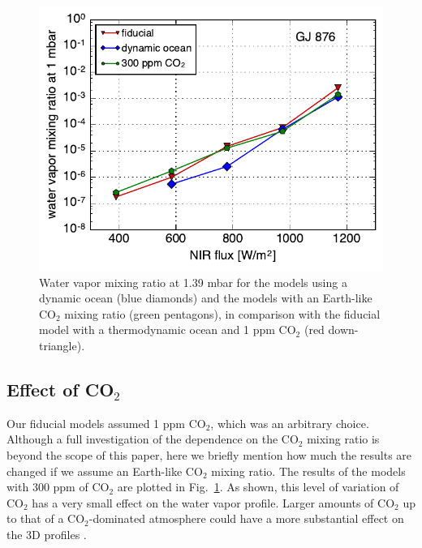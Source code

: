 \documentclass[11pt,numberedappendix,twocolappendix,]{emulateapj}
\def\wv{water vapor}
\begin{document}
\begin{figure}[!h]
    \begin{center}
    \includegraphics[width=0.9\hsize]{xH2O_sensitivity.pdf}
    \end{center}
\caption{Water vapor mixing ratio at 1.39 mbar for the models using a dynamic ocean (blue diamonds) and the models with an Earth-like CO$_2$ mixing ratio (green pentagons), in comparison with the fiducial model with a thermodynamic ocean and 1 ppm CO$_2$ (red down-triangle). }
\label{fig:change_ocean}
\end{figure}

\subsection{Effect of CO$_2$}
\label{ss:sensitivity_ocean}

Our fiducial models assumed 1 ppm CO$_2$, which was an arbitrary choice. 
Although a full investigation of the dependence on the CO$_2$ mixing ratio is beyond the scope of this paper, here we briefly mention how much the results are changed if we assume an Earth-like CO$_2$ mixing ratio. 
The results of the models with 300 ppm of CO$_2$ are plotted in Fig.~\ref{fig:change_ocean}. 
As shown, this level of variation of CO$_2$ has a very small effect on the \wv{} profile. 
Larger amounts of CO$_2$ up to that of a CO$_2$-dominated atmosphere could have a more substantial effect on the 3D profiles \citep{Wordsworth2013}. 


\end{document}
